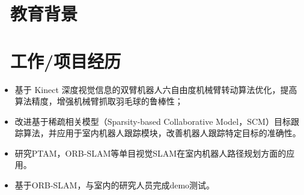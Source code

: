 \documentclass{resume}
\begin{document}


\section{\faGraduationCap\  教育背景}

\section{\faUsers\ 工作/项目经历}


\begin{itemize}
  \item 基于 Kinect 深度视觉信息的双臂机器人六自由度机械臂转动算法优化，提高算法精度，增强机械臂抓取羽毛球的鲁棒性；
  \item 改进基于稀疏相关模型（Sparsity-based Collaborative Model，SCM）目标跟踪算法，并应用于室内机器人跟踪模块，改善机器人跟踪特定目标的准确性。
  \item 研究PTAM，ORB-SLAM等单目视觉SLAM在室内机器人路径规划方面的应用。
  \item 基于ORB-SLAM，与室内的研究人员完成demo测试。
\end{itemize}
\end{document}
